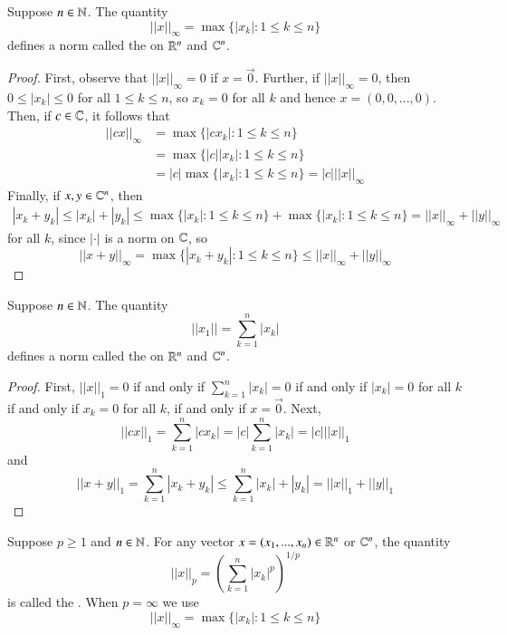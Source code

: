 \begin{proposition}
    Suppose $n \in \mathbb N$. The quantity $$||x||_{\infty} = \max\{|x_k|:1\leq k \leq n\}$$ defines a norm called the  on $\mathbb R^n$ and $\mathbb C^n$.
\end{proposition}
\begin{proof}
    First, observe that $||x||_{\infty} = 0$ if $x = \vec{0}$. Further, if $||x||_{\infty} = 0$, then $0 \leq |x_k| \leq 0$ for all $1 \leq k \leq n$, so $x_k = 0$ for all $k$ and hence $x = (0,0,...,0)$. Then, if $c \in \mathbb C$, it follows that \begin{align*}
        ||cx||_{\infty} &= \max\{|cx_k|:1\leq k \leq n\} \\
        &= \max\{|c||x_k|:1\leq k\leq n\} \\
        &= |c|\max\{|x_k|:1\leq k \leq n\} = |c|||x||_{\infty}
    \end{align*}
    Finally, if $x,y \in \mathbb C^n$, then \begin{align*}
        |x_k+y_k| \leq |x_k| + |y_k| \leq \max\{|x_k|:1\leq k\leq n\} + \max\{|x_k|:1\leq k\leq n\} = ||x||_{\infty} + ||y||_{\infty}
    \end{align*}
    for all $k$, since $|\cdot|$ is a norm on $\mathbb C$, so $$||x+y||_{\infty} = \max\{|x_k+y_k|:1\leq k \leq n\} \leq ||x||_{\infty} + ||y||_{\infty}$$
\end{proof}

\begin{proposition}
    Suppose $n \in \mathbb N$. The quantity $$||x_1|| = \sum_{k=1}^n|x_k|$$ defines a norm called the  on $\mathbb R^n$ and $\mathbb C^n$.
\end{proposition}
\begin{proof}
    First, $||x||_1 = 0$ if and only if $\sum_{k=1}^n|x_k| = 0$ if and only if $|x_k| = 0$ for all $k$ if and only if $x_k = 0$ for all $k$, if and only if $x = \vec{0}$. Next, $$||cx||_1 = \sum_{k=1}^n|cx_k| = |c|\sum_{k=1}^n|x_k| = |c|||x||_1$$ and $$||x + y||_1 = \sum_{k=1}^n|x_k+y_k| \leq \sum_{k=1}^n|x_k|+|y_k| = ||x||_1 + ||y||_1$$
\end{proof}

\begin{definition}
    Suppose $p \geq 1$ and $n \in \mathbb N$. For any vector $x = (x_1,...,x_n) \in \mathbb R^n$ or $\mathbb C^n$, the quantity $$||x||_p = \left(\sum_{k=1}^n|x_k|^p\right)^{1/p}$$ is called the . When $p = \infty$ we use $$||x||_{\infty} = \max\{|x_k|:1\leq k\leq n\}$$
\end{definition}

